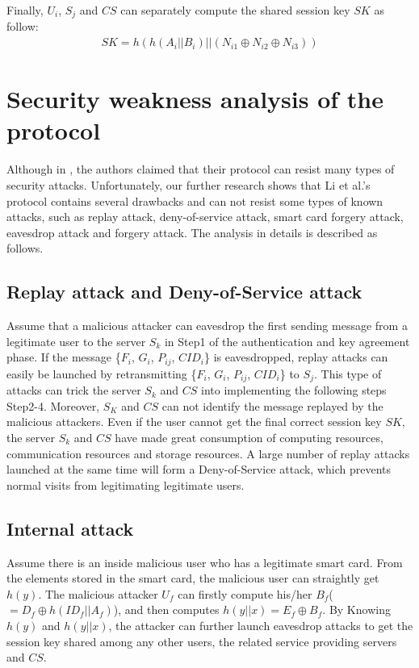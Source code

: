 \documentclass[preprint,12pt]{elsarticle}
\begin{document}
 Finally, $U_i$, $S_j$ and $CS$ can separately compute the shared session key $SK$ as follow:
\begin{eqnarray}
SK=h(h(A_i||B_i)||(N_{i1}\oplus N_{i2}\oplus N_{i3}))
\end{eqnarray}

\section{Security weakness analysis of the protocol}
Although in \cite{passwd-based-multi7}, the authors claimed that their protocol can resist many types of security attacks. Unfortunately, our further research shows that Li et al.'s protocol contains several drawbacks and can not resist some types of known attacks, such as replay attack, deny-of-service attack, smart card forgery attack, eavesdrop attack and forgery attack. The analysis in details is described as follows.

\subsection{Replay attack and Deny-of-Service attack}
Assume that a malicious attacker can eavesdrop the first sending message from a legitimate user to the server $S_k$ in Step1 of the authentication and key agreement phase. If the message \{$F_i$, $G_i$, $P_{ij}$, $CID_i$\} is eavesdropped,  replay attacks can easily be launched by retransmitting \{$F_i$, $G_i$, $P_{ij}$, $CID_i$\} to $S_j$. This type of attacks can trick the server $S_k$ and $CS$ into implementing the following steps Step2-4. Moreover, $S_K$ and $CS$ can not identify the message replayed by the malicious attackers. Even if the user cannot get the final correct session key $SK$, the server $S_k$ and $CS$ have made great consumption of computing resources, communication resources and storage resources. A large number of replay attacks launched at the same time will form a Deny-of-Service attack, which prevents normal visits from legitimating legitimate users.

\subsection{Internal attack}
Assume there is an inside malicious user who has a legitimate smart card. From the elements stored in the smart card, the malicious user can straightly get $h(y)$. The malicious attacker $U_f$ can firstly compute his/her $B_f$($ = D_f \oplus h(ID_f||A_f)$), and then computes $h(y||x)=E_f\oplus B_f$. By Knowing $h(y)$ and $h(y||x)$, the attacker can further launch eavesdrop attacks to get the session key shared among any other users, the related service providing servers and $CS$.
\end{document}
